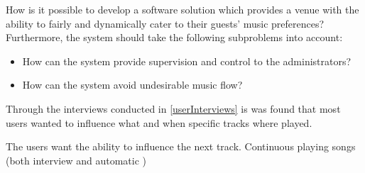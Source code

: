 How is it possible to develop a software solution which provides a venue with the ability to fairly and dynamically cater to their guests' music preferences?\\
Furthermore, the system should take the following subproblems into account:
\begin{itemize}
\item How can the system provide supervision and control to the administrators?
\item How can the system avoid undesirable music flow?
\end{itemize}


Through the interviews conducted in \cref{userInterviews} is was found that most users wanted to influence what and when specific tracks where played. 

The users want the ability to influence the next track.
Continuous playing songs (both interview and automatic )  